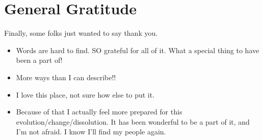 \documentclass[
]{book}
\providecommand{\tightlist}{%
  \setlength{\itemsep}{0pt}\setlength{\parskip}{0pt}}
\begin{document}
\section{General Gratitude}\label{general-gratitude}

Finally, some folks just wanted to say thank you.

\begin{itemize}
\tightlist
\item
  Words are hard to find. SO grateful for all of it. What a special thing to have been a part of!
\item
  More ways than I can describe!!
\item
  I love this place, not sure how else to put it.
\item
  Because of that I actually feel more prepared for this evolution/change/dissolution. It has been wonderful to be a part of it, and I'm not afraid. I know I'll find my people again.
\end{itemize}

  
\end{document}
